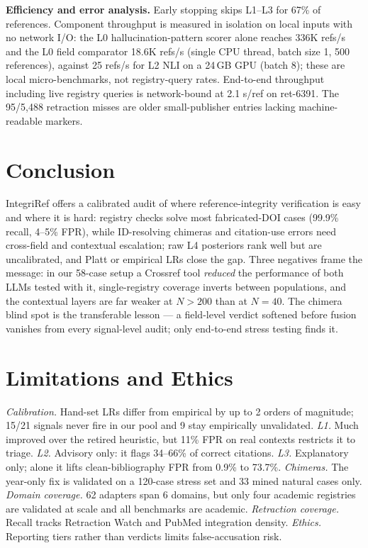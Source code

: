\documentclass[runningheads]{llncs}
\begin{document}
\noindent\textbf{Efficiency and error analysis.} Early stopping skips L1--L3 for 67\% of references. Component throughput is measured in isolation on local inputs with no network I/O: the L0 hallucination-pattern scorer alone reaches 336K refs/s and the L0 field comparator 18.6K refs/s (single CPU thread, batch size 1, 500 references), against 25 refs/s for L2 NLI on a 24\,GB GPU (batch 8); these are local micro-benchmarks, not registry-query rates. End-to-end throughput including live registry queries is network-bound at 2.1 s/ref on ret-6391. The 95/5{,}488 retraction misses are older small-publisher entries lacking machine-readable markers.

\section{Conclusion}

IntegriRef offers a calibrated audit of where reference-integrity verification is easy and where it is hard: registry checks solve most fabricated-DOI cases (99.9\% recall, 4--5\% FPR), while ID-resolving chimeras and citation-use errors need cross-field and contextual escalation; raw L4 posteriors rank well but are uncalibrated, and Platt or empirical LRs close the gap. Three negatives frame the message: in our 58-case setup a Crossref tool \emph{reduced} the performance of both LLMs tested with it, single-registry coverage inverts between populations, and the contextual layers are far weaker at $N{>}200$ than at $N{=}40$. The chimera blind spot is the transferable lesson --- a field-level verdict softened before fusion vanishes from every signal-level audit; only end-to-end stress testing finds it.

\section*{Limitations and Ethics}
\emph{Calibration.} Hand-set LRs differ from empirical by up to 2 orders of magnitude; 15/21 signals never fire in our pool and 9 stay empirically unvalidated. \emph{L1.} Much improved over the retired heuristic, but 11\% FPR on real contexts restricts it to triage. \emph{L2.} Advisory only: it flags 34--66\% of correct citations. \emph{L3.} Explanatory only; alone it lifts clean-bibliography FPR from 0.9\% to 73.7\%. \emph{Chimeras.} The year-only fix is validated on a 120-case stress set and 33 mined natural cases only. \emph{Domain coverage.} 62 adapters span 6 domains, but only four academic registries are validated at scale and all benchmarks are academic. \emph{Retraction coverage.} Recall tracks Retraction Watch and PubMed integration density. \emph{Ethics.} Reporting tiers rather than verdicts limits false-accusation risk.



\end{document}
